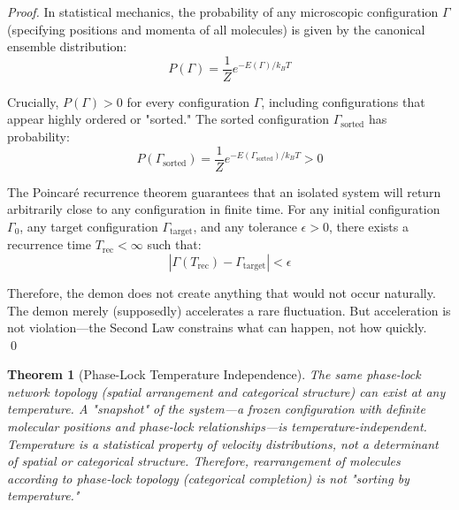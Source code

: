 \documentclass[12pt,a4paper]{article}
\newtheorem{theorem}{Theorem}[section]
\theoremstyle{definition}
\theoremstyle{remark}
\begin{document}
\begin{proof}
In statistical mechanics, the probability of any microscopic configuration $\Gamma$ (specifying positions and momenta of all molecules) is given by the canonical ensemble distribution:
\begin{equation}
P(\Gamma) = \frac{1}{Z} e^{-E(\Gamma)/k_B T}
\label{eq:boltzmann_distribution}
\end{equation}

Crucially, $P(\Gamma) > 0$ for every configuration $\Gamma$, including configurations that appear highly ordered or "sorted." The sorted configuration $\Gamma_{\text{sorted}}$ has probability:
\begin{equation}
P(\Gamma_{\text{sorted}}) = \frac{1}{Z} e^{-E(\Gamma_{\text{sorted}})/k_B T} > 0
\end{equation}

The Poincaré recurrence theorem guarantees that an isolated system will return arbitrarily close to any configuration in finite time. For any initial configuration $\Gamma_0$, any target configuration $\Gamma_{\text{target}}$, and any tolerance $\epsilon > 0$, there exists a recurrence time $T_{\text{rec}} < \infty$ such that:
\begin{equation}
|\Gamma(T_{\text{rec}}) - \Gamma_{\text{target}}| < \epsilon
\end{equation}

Therefore, the demon does not create anything that would not occur naturally. The demon merely (supposedly) accelerates a rare fluctuation. But acceleration is not violation—the Second Law constrains what can happen, not how quickly. \qed
\end{proof}

\begin{theorem}[Phase-Lock Temperature Independence]
\label{thm:phase_lock_temperature_independence}
The same phase-lock network topology (spatial arrangement and categorical structure) can exist at any temperature. A "snapshot" of the system—a frozen configuration with definite molecular positions and phase-lock relationships—is temperature-independent. Temperature is a statistical property of velocity distributions, not a determinant of spatial or categorical structure. Therefore, rearrangement of molecules according to phase-lock topology (categorical completion) is not "sorting by temperature."
\end{theorem}
\end{document}
